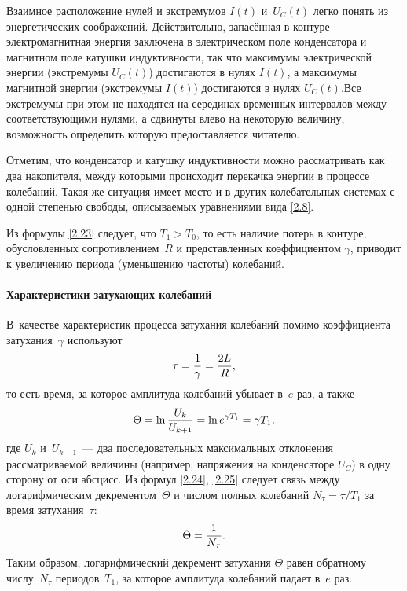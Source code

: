 Взаимное расположение нулей и экстремумов $I(t)$ и~$U_C(t)$ легко понять из
энергетических соображений. Действительно, запасённая в контуре электромагнитная
энергия заключена в электрическом поле конденсатора и магнитном поле катушки
индуктивности, так что максимумы электрической энергии (экстремумы $U_C(t)$)
достигаются в нулях $I(t)$, а максимумы магнитной энергии (экстремумы $I(t)$)
достигаются в нулях $U_C(t)$.Все экстремумы при этом не находятся на серединах 
временных интервалов между соответствующими нулями, а сдвинуты влево на некоторую 
величину, возможность определить которую предоставляется читателю.

Отметим, что конденсатор и катушку индуктивности можно рассматривать как два 
накопителя, между которыми происходит перекачка энергии в процессе колебаний. 
Такая же ситуация имеет место и в других колебательных системах с одной степенью 
свободы, описываемых уравнениями вида \eqref{2.8}.

Из формулы \eqref{2.23} следует, что $T_1>T_0$, то есть наличие потерь в
контуре, обусловленных сопротивлением~$R$ и представленных коэффициентом
$\gamma$, приводит к увеличению периода (уменьшению частоты) колебаний.

\paragraph{Характеристики затухающих колебаний}
В~качестве характеристик процесса затухания колебаний помимо коэффициента
затухания~$\gamma$ используют 
\begin{equation}\eqmark{2.24}
	\tau=\frac1\gamma=\frac{2L}{R},
\end{equation}
то есть время, за которое амплитуда колебаний убывает в~$e$ раз, а также
\begin{equation}\eqmark{2.25}
	\Theta=\ln\dfrac{U_{k}}{U_{k+1}}=\ln e^{\gamma T_1}=\gamma T_1,
\end{equation}
где $U_{k}$ и~$U_{k+1}$~--- два последовательных максимальных отклонения
рассматриваемой величины (например, напряжения на конденсаторе $U_C$) в одну
сторону от оси абсцисс. Из формул \eqref{2.24}, \eqref{2.25} следует связь между
логарифмическим декрементом~$\Theta$ и числом полных колебаний $N_{\tau}=\tau/T_1$ за
время затухания~$\tau$:
\begin{equation}\eqmark{2.26}
\Theta=\frac{1}{N_{\tau}}.
\end{equation}
Таким образом, логарифмический декремент затухания $\Theta$ равен обратному
числу~$N_{\tau}$ периодов~$T_1$, за которое амплитуда колебаний падает в~$e$ раз.

